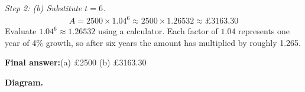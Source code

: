 \documentclass[11pt]{article}
\begin{document}
\textit{Step 2: (b) Substitute \( t = 6 \).}
\[\begin{gathered}
A = 2500 \times 1.04^6 \approx 2500 \times 1.26532 \approx \pounds 3163.30
\end{gathered}\]
Evaluate \( 1.04^6 \approx 1.26532 \) using a calculator. Each factor of \( 1.04 \) represents one year of 4\% growth, so after six years the amount has multiplied by roughly 1.265.

\begin{answerbox}
\textbf{Final answer:}\quad (a) \pounds 2500 \quad  (b) \pounds 3163.30
\end{answerbox}
\textbf{Diagram.}

\begin{center}
\end{center}
\end{document}
